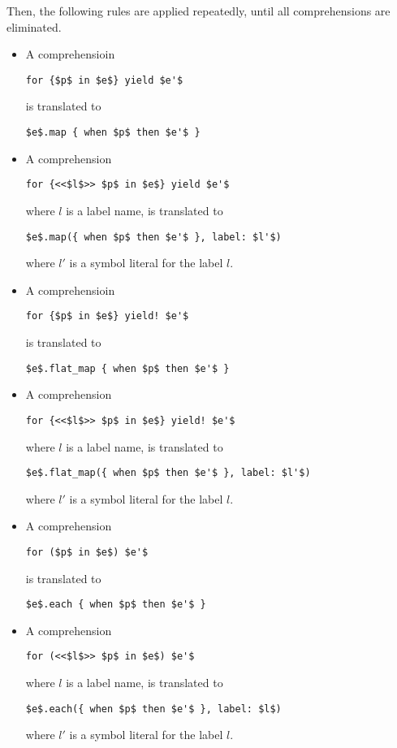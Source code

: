 Then, the following rules are applied repeatedly, until all comprehensions are eliminated. 
\begin{itemize}

\item A comprehensioin 
\begin{lstlisting}
for {$p$ in $e$} yield $e'$
\end{lstlisting}
is translated to
\begin{lstlisting}
$e$.map { when $p$ then $e'$ }
\end{lstlisting}

\item A comprehension
\begin{lstlisting}
for {<<$l$>> $p$ in $e$} yield $e'$
\end{lstlisting}
where $l$ is a label name, is translated to
\begin{lstlisting}[deletekeywords={label}]
$e$.map({ when $p$ then $e'$ }, label: $l'$)
\end{lstlisting}
where $l'$ is a symbol literal for the label $l$. 

\item A comprehensioin 
\begin{lstlisting}
for {$p$ in $e$} yield! $e'$
\end{lstlisting}
is translated to
\begin{lstlisting}
$e$.flat_map { when $p$ then $e'$ }
\end{lstlisting}

\item A comprehension
\begin{lstlisting}
for {<<$l$>> $p$ in $e$} yield! $e'$
\end{lstlisting}
where $l$ is a label name, is translated to
\begin{lstlisting}[deletekeywords={label}]
$e$.flat_map({ when $p$ then $e'$ }, label: $l'$)
\end{lstlisting}
where $l'$ is a symbol literal for the label $l$. 


\item A comprehension 
\begin{lstlisting}
for ($p$ in $e$) $e'$
\end{lstlisting}
is translated to
\begin{lstlisting}
$e$.each { when $p$ then $e'$ }
\end{lstlisting}

\item A comprehension 
\begin{lstlisting}
for (<<$l$>> $p$ in $e$) $e'$
\end{lstlisting}
where $l$ is a label name, is translated to
\begin{lstlisting}[deletekeywords={label}]
$e$.each({ when $p$ then $e'$ }, label: $l$)
\end{lstlisting}
where $l'$ is a symbol literal for the label $l$. 


\end{itemize}
